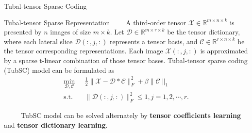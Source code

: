 \documentclass[t, 10pt, handout, aspectratio=169]{beamer}
\begin{document}

\begin{frame}{Tubal-tensor Sparse Coding}
\begin{block}{Tubal-tensor Sparse Representation}
~~~~A third-order tensor $\mathcal{X} \in \mathbb{R}^{m\times n\times k}$ is presented by $n$ images of size $m \times k$. Let $\mathcal{D} \in \mathbb{R}^{m\times r\times k}$ be the tensor dictionary, where each lateral slice $\mathcal{D}(:,j,:)$ represents a tensor basis, and $\mathcal{C}\in \mathbb{R}^{r\times n \times k}$ be the tensor corresponding representations. Each image $\mathcal{X}(:,j,:)$ is approximated by a sparse t-linear combination of those tensor bases. Tubal-tensor sparse coding (TubSC) model can be formulated as
$$
\begin{aligned}
\min_{\mathcal{D},\mathcal{C}}&~~~\frac{1}{2}\|\mathcal{X}-\mathcal{D}*\mathcal{C}\|_{F}^{2}+\beta\|\mathcal{C}\|_1 \\
\text{s.t.} &~~~ \|\mathcal{D}(:,j,:)\|_F^2\le 1, j=1,2,\cdots,r.
\end{aligned}
$$
\end{block}
~~~~~TubSC model can be solved alternately by \textbf{tensor coefficients learning} and \textbf{tensor dictionary learning}.
\end{frame}
\end{document}
